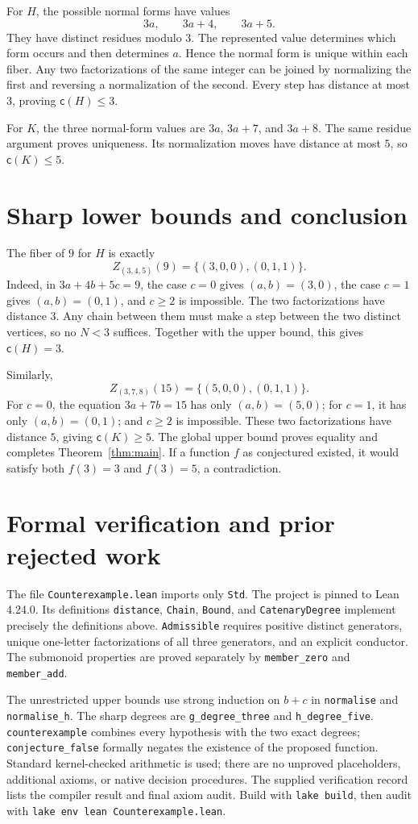 \documentclass[11pt]{article}
\newcommand{\cdeg}{\mathsf c}
\begin{document}
For $H$, the possible normal forms have values
\[
3a,\qquad 3a+4,\qquad 3a+5.
\]
They have distinct residues modulo $3$. The represented value determines
which form occurs and then determines $a$. Hence the normal form is unique
within each fiber. Any two factorizations of the same integer can be joined
by normalizing the first and reversing a normalization of the second.
Every step has distance at most $3$, proving $\cdeg(H)\le3$.

For $K$, the three normal-form values are $3a$, $3a+7$, and $3a+8$.
The same residue argument proves uniqueness. Its normalization moves have
distance at most $5$, so $\cdeg(K)\le5$.

\section{Sharp lower bounds and conclusion}
The fiber of $9$ for $H$ is exactly
\[
Z_{(3,4,5)}(9)=\{(3,0,0),(0,1,1)\}.
\]
Indeed, in $3a+4b+5c=9$, the case $c=0$ gives $(a,b)=(3,0)$, the case
$c=1$ gives $(a,b)=(0,1)$, and $c\ge2$ is impossible. The two
factorizations have distance $3$. Any chain between them must make a step
between the two distinct vertices, so no $N<3$ suffices.
Together with the upper bound, this gives $\cdeg(H)=3$.

Similarly,
\[
Z_{(3,7,8)}(15)=\{(5,0,0),(0,1,1)\}.
\]
For $c=0$, the equation $3a+7b=15$ has only $(a,b)=(5,0)$;
for $c=1$, it has only $(a,b)=(0,1)$; and $c\ge2$ is impossible.
These two factorizations have distance $5$, giving $\cdeg(K)\ge5$.
The global upper bound proves equality and completes Theorem~\ref{thm:main}.
If a function $f$ as conjectured existed, it would satisfy both $f(3)=3$
and $f(3)=5$, a contradiction.

\section{Formal verification and prior rejected work}
The file \texttt{Counterexample.lean} imports only \texttt{Std}.
The project is pinned to Lean 4.24.0. Its definitions
\texttt{distance}, \texttt{Chain}, \texttt{Bound}, and
\texttt{CatenaryDegree} implement precisely the definitions above.
\texttt{Admissible} requires positive distinct generators, unique one-letter
factorizations of all three generators, and an explicit conductor.
The submonoid properties are proved separately by \texttt{member\_zero}
and \texttt{member\_add}.

The unrestricted upper bounds use strong induction on $b+c$ in
\texttt{normalise} and \texttt{normalise\_h}. The sharp degrees are
\texttt{g\_degree\_three} and \texttt{h\_degree\_five}.
\texttt{counterexample} combines every hypothesis with the two exact degrees;
\texttt{conjecture\_false} formally negates the existence of the proposed
function. Standard kernel-checked arithmetic is used; there are no unproved
placeholders, additional axioms, or native decision procedures.
The supplied verification record lists the compiler result and final axiom
audit. Build with \texttt{lake build}, then audit with
\texttt{lake env lean Counterexample.lean}.
\end{document}

